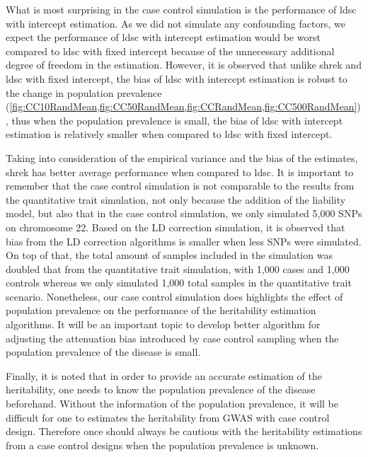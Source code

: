 	What is most surprising in the case control simulation is the performance of \gls{ldsc} with intercept estimation.
	As we did not simulate any confounding factors, we expect the performance of \gls{ldsc} with intercept estimation would be worst compared to \gls{ldsc} with fixed intercept because of the unnecessary additional degree of freedom in the estimation. 
	However, it is observed that unlike \gls{shrek} and \gls{ldsc} with fixed intercept, the bias of \gls{ldsc} with intercept estimation is robust to the change in population prevalence (\cref{fig:CC10RandMean,fig:CC50RandMean,fig:CCRandMean,fig:CC500RandMean}), thus when the population prevalence is small, the bias of \gls{ldsc} with intercept estimation is relatively smaller when compared to \gls{ldsc} with fixed intercept.

	Taking into consideration of the empirical variance and the bias of the estimates, \gls{shrek} has better average performance when compared to \gls{ldsc}. 
	It is important to remember that the case control simulation is not comparable to the results from the quantitative trait simulation, not only because the addition of the liability model, but also that in the case control simulation, we only simulated 5,000 \glspl{SNP} on chromosome 22.
	Based on the \gls{LD} correction simulation, it is observed that bias from the \gls{LD} correction algorithms is smaller when less \glspl{SNP} were simulated. 
	On top of that, the total amount of samples included in the simulation was doubled that from the quantitative trait simulation, with 1,000 cases and 1,000 controls whereas we only simulated 1,000 total samples in the quantitative trait scenario. 
	Nonetheless, our case control simulation does highlights the effect of population prevalence on the performance of the heritability estimation algorithms.
	It will be an important topic to develop better algorithm for adjusting the attenuation bias introduced by case control sampling when the population prevalence of the disease is small.

	Finally, it is noted that in order to provide an accurate estimation of the heritability, one needs to know the population prevalence of the disease beforehand. 
	Without the information of the population prevalence, it will be difficult for one to estimates the heritability from \gls{GWAS} with case control design. 
	Therefore once should always be cautious with the heritability estimations from a case control designs when the population prevalence is unknown.
	
